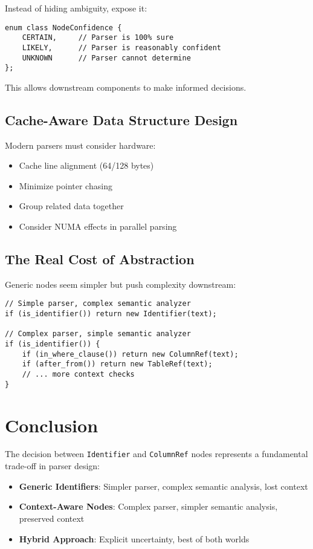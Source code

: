 \documentclass[11pt,a4paper]{article}
\begin{document}
Instead of hiding ambiguity, expose it:

\begin{lstlisting}[style=cpp]
enum class NodeConfidence {
    CERTAIN,     // Parser is 100% sure
    LIKELY,      // Parser is reasonably confident
    UNKNOWN      // Parser cannot determine
};
\end{lstlisting}

This allows downstream components to make informed decisions.

\subsection{Cache-Aware Data Structure Design}

Modern parsers must consider hardware:
\begin{itemize}
    \item Cache line alignment (64/128 bytes)
    \item Minimize pointer chasing
    \item Group related data together
    \item Consider NUMA effects in parallel parsing
\end{itemize}

\subsection{The Real Cost of Abstraction}

Generic nodes seem simpler but push complexity downstream:

\begin{lstlisting}[style=cpp]
// Simple parser, complex semantic analyzer
if (is_identifier()) return new Identifier(text);

// Complex parser, simple semantic analyzer  
if (is_identifier()) {
    if (in_where_clause()) return new ColumnRef(text);
    if (after_from()) return new TableRef(text);
    // ... more context checks
}
\end{lstlisting}

\section{ Conclusion}

The decision between \texttt{Identifier} and \texttt{ColumnRef} nodes represents a fundamental trade-off in parser design:

\begin{itemize}
    \item \textbf{Generic Identifiers}: Simpler parser, complex semantic analysis, lost context
    \item \textbf{Context-Aware Nodes}: Complex parser, simpler semantic analysis, preserved context
    \item \textbf{Hybrid Approach}: Explicit uncertainty, best of both worlds
\end{itemize}
\end{document}
